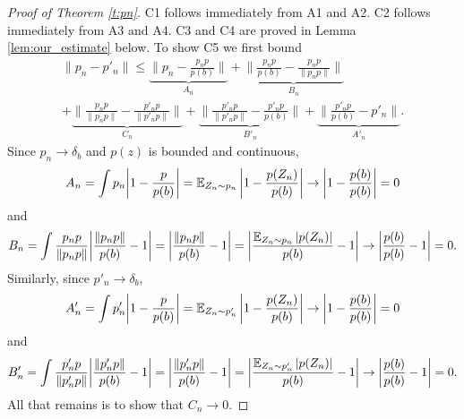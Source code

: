\begin{proof}[Proof of Theorem \ref{t:pn}]
C1 follows immediately from A1 and A2. C2 follows immediately from A3 and A4. C3 and C4 are proved in Lemma \ref{lem:our_estimate} below. To show C5 we first bound
\begin{multline*} \| p_n - p'_n \| \leq \underbrace{\bigg\| p_n - \frac{p_n p}{p(b)} \bigg\|}_{A_n} + \underbrace{\bigg\| \frac{p_n p}{p(b)} - \frac{p_n p}{\|p_n p\|} \bigg\|}_{B_n} \\ + \underbrace{\bigg\| \frac{p_n p}{\|p_n p\|} - \frac{p'_n p}{\|p'_n p\|} \bigg\|}_{C_n} + \underbrace{\bigg\| \frac{p'_n p}{\|p'_n p\|} - \frac{p'_n p}{p(b)} \bigg\|}_{B'_n} + \underbrace{\bigg\|  \frac{p'_n p}{p(b)} - p'_n \bigg\|}_{A'_n} . \end{multline*}
Since $p_n\to\delta_b$ and $p(z)$ is bounded and continuous,
\[ A_n = \int p_n \bigg|1-\frac{p}{p(b)}\bigg| = \operatorname{\mathbb{E}}_{Z_n\sim p_n}\bigg|1-\frac{p(Z_n)}{p(b)}\bigg| \to \bigg|1-\frac{p(b)}{p(b)}\bigg| = 0  \]
and
\[ B_n = \int \frac{p_n p}{\|p_n p\|} \bigg|\frac{\|p_np\|}{p(b)}-1\bigg| = \bigg|\frac{\|p_np\|}{p(b)}-1\bigg| = \bigg|\frac{\operatorname{\mathbb{E}}_{Z_n\sim p_n}|p(Z_n)|}{p(b)}-1\bigg| \to \bigg|\frac{p(b)}{p(b)}-1\bigg| = 0 . \]
Similarly, since $p'_n\to\delta_b$,
\[ A'_n = \int p'_n \bigg|1-\frac{p}{p(b)}\bigg| = \operatorname{\mathbb{E}}_{Z_n\sim p'_n}\bigg|1-\frac{p(Z_n)}{p(b)}\bigg| \to \bigg|1-\frac{p(b)}{p(b)}\bigg| = 0  \]
and
\[ B'_n = \int \frac{p'_n p}{\|p'_n p\|} \bigg|\frac{\|p'_np\|}{p(b)}-1\bigg| = \bigg|\frac{\|p'_np\|}{p(b)}-1\bigg| = \bigg|\frac{\operatorname{\mathbb{E}}_{Z_n\sim p'_n}|p(Z_n)|}{p(b)}-1\bigg| \to \bigg|\frac{p(b)}{p(b)}-1\bigg| = 0 . \]
All that remains is to show that $C_n\to 0$.


\end{proof}
